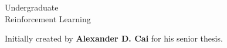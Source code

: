 \documentclass[12pt,twoside,letterpaper,openany]{book}
\begin{document}
    
\frontmatter

\begin{titlepage}
    
    {\Huge Undergraduate \\ Reinforcement Learning}


    Initially created by \textbf{Alexander D. Cai} for his senior thesis.

    \tableofcontents

\end{titlepage}


\mainmatter






\end{document}
